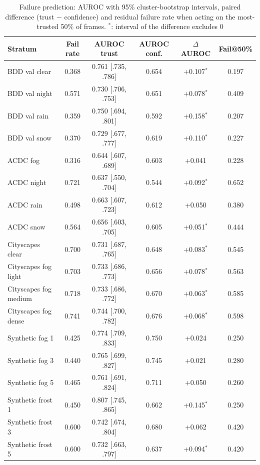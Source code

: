 \documentclass[pdflatex,sn-mathphys-num]{sn-jnl}
\begin{document}
\begin{table}[t]
\caption{Failure prediction: AUROC with 95\% cluster-bootstrap intervals, paired difference (trust $-$ confidence) and residual failure rate when acting on the most-trusted 50\% of frames. $^\ast$: interval of the difference excludes 0}
\label{tab:trust}
\footnotesize
\setlength{\tabcolsep}{4pt}
\begin{tabular}{@{}lccccc@{}}
\toprule
Stratum & Fail rate & AUROC trust & AUROC conf. & $\Delta$AUROC & Fail@50\% \\
\midrule
BDD val clear & 0.368 & 0.761 [.735, .786] & 0.654 & +0.107$^\ast$ & 0.197 \\
BDD val night & 0.571 & 0.730 [.706, .753] & 0.651 & +0.078$^\ast$ & 0.409 \\
BDD val rain & 0.359 & 0.750 [.694, .801] & 0.592 & +0.158$^\ast$ & 0.207 \\
BDD val snow & 0.370 & 0.729 [.677, .777] & 0.619 & +0.110$^\ast$ & 0.227 \\
ACDC fog & 0.316 & 0.644 [.607, .689] & 0.603 & +0.041 & 0.228 \\
ACDC night & 0.721 & 0.637 [.550, .704] & 0.544 & +0.092$^\ast$ & 0.652 \\
ACDC rain & 0.498 & 0.663 [.607, .723] & 0.612 & +0.050 & 0.380 \\
ACDC snow & 0.564 & 0.656 [.603, .705] & 0.605 & +0.051$^\ast$ & 0.444 \\
Cityscapes clear & 0.700 & 0.731 [.687, .765] & 0.648 & +0.083$^\ast$ & 0.545 \\
Cityscapes fog light & 0.703 & 0.733 [.686, .773] & 0.656 & +0.078$^\ast$ & 0.563 \\
Cityscapes fog medium & 0.718 & 0.733 [.686, .772] & 0.670 & +0.063$^\ast$ & 0.585 \\
Cityscapes fog dense & 0.741 & 0.744 [.700, .782] & 0.676 & +0.068$^\ast$ & 0.598 \\
Synthetic fog 1 & 0.425 & 0.774 [.709, .833] & 0.750 & +0.024 & 0.250 \\
Synthetic fog 3 & 0.440 & 0.765 [.699, .827] & 0.745 & +0.021 & 0.280 \\
Synthetic fog 5 & 0.465 & 0.761 [.691, .824] & 0.711 & +0.050 & 0.260 \\
Synthetic frost 1 & 0.450 & 0.807 [.745, .865] & 0.662 & +0.145$^\ast$ & 0.250 \\
Synthetic frost 3 & 0.600 & 0.742 [.674, .804] & 0.680 & +0.062 & 0.420 \\
Synthetic frost 5 & 0.600 & 0.732 [.663, .797] & 0.637 & +0.094$^\ast$ & 0.420 \\

\end{tabular}
\end{table}
\end{document}
